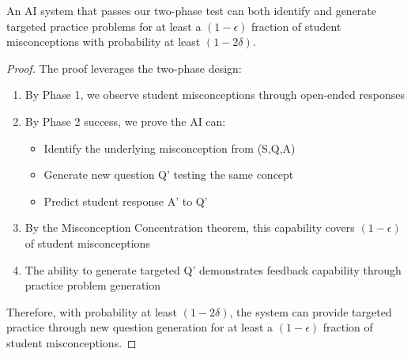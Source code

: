 \begin{theorem}
An AI system that passes our two-phase test can both identify and generate targeted practice problems for at least a $(1-\epsilon)$ fraction of student misconceptions with probability at least $(1-2\delta)$.
\end{theorem}

\begin{proof}
The proof leverages the two-phase design:
\begin{enumerate}
    \item By Phase 1, we observe student misconceptions through open-ended responses
    \item By Phase 2 success, we prove the AI can:
        \begin{itemize}
            \item Identify the underlying misconception from (S,Q,A)
            \item Generate new question Q' testing the same concept
            \item Predict student response A' to Q'
        \end{itemize}
    \item By the Misconception Concentration theorem, this capability covers $(1-\epsilon)$ of student misconceptions
    \item The ability to generate targeted Q' demonstrates feedback capability through practice problem generation
\end{enumerate}

Therefore, with probability at least $(1-2\delta)$, the system can provide targeted practice through new question generation for at least a $(1-\epsilon)$ fraction of student misconceptions.
\end{proof}

